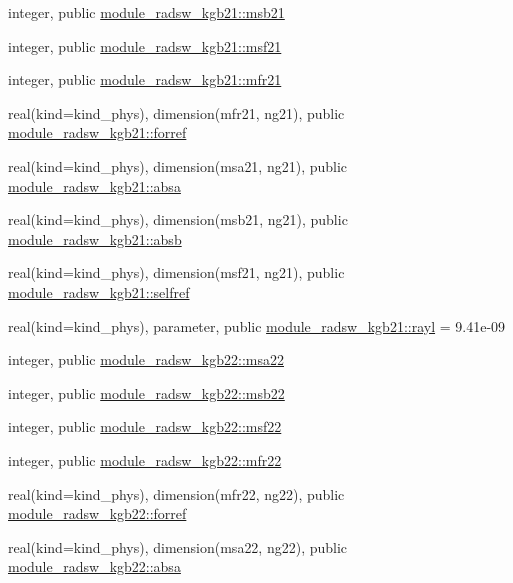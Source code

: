 \begin{DoxyCompactItemize}
\item 
integer, public \hyperlink{group__module__radsw__main_ga59710ca5b31c30385ea968c0f01e2e81}{module\+\_\+radsw\+\_\+kgb21\+::msb21}
\item 
integer, public \hyperlink{group__module__radsw__main_gae70b5abfa847419cbf189d2502c34ddd}{module\+\_\+radsw\+\_\+kgb21\+::msf21}
\item 
integer, public \hyperlink{group__module__radsw__main_ga5575239aa9d55abcca1ac1f82dc4c4ec}{module\+\_\+radsw\+\_\+kgb21\+::mfr21}
\item 
real(kind=kind\+\_\+phys), dimension(mfr21, ng21), public \hyperlink{group__module__radsw__main_gac93d473e0309275f03a89b161377a034}{module\+\_\+radsw\+\_\+kgb21\+::forref}
\item 
real(kind=kind\+\_\+phys), dimension(msa21, ng21), public \hyperlink{group__module__radsw__main_ga7cce83c282d3efec6a3fe319480c270a}{module\+\_\+radsw\+\_\+kgb21\+::absa}
\item 
real(kind=kind\+\_\+phys), dimension(msb21, ng21), public \hyperlink{group__module__radsw__main_ga1d3f12f050c90be49f109205c463b29b}{module\+\_\+radsw\+\_\+kgb21\+::absb}
\item 
real(kind=kind\+\_\+phys), dimension(msf21, ng21), public \hyperlink{group__module__radsw__main_ga76fc3e4566fcee982b99b10ea562ba93}{module\+\_\+radsw\+\_\+kgb21\+::selfref}
\item 
real(kind=kind\+\_\+phys), parameter, public \hyperlink{group__module__radsw__main_ga8df418599fb8aef5fc8f2935a913b361}{module\+\_\+radsw\+\_\+kgb21\+::rayl} = 9.\+41e-\/09
\item 
integer, public \hyperlink{namespacemodule__radsw__kgb22_a4134c2cd3b31db5e0adb5c3c2ad87905}{module\+\_\+radsw\+\_\+kgb22\+::msa22}
\item 
integer, public \hyperlink{group__module__radsw__main_ga3398f8d12ec0349b44197873ac58fd98}{module\+\_\+radsw\+\_\+kgb22\+::msb22}
\item 
integer, public \hyperlink{group__module__radsw__main_ga0903a020c9e4a4f7c21911d2ab98fd46}{module\+\_\+radsw\+\_\+kgb22\+::msf22}
\item 
integer, public \hyperlink{group__module__radsw__main_ga0afe8facbe4837a22c96a0d2000a20ee}{module\+\_\+radsw\+\_\+kgb22\+::mfr22}
\item 
real(kind=kind\+\_\+phys), dimension(mfr22, ng22), public \hyperlink{group__module__radsw__main_ga509916fac772945555a1b3fd0d002c93}{module\+\_\+radsw\+\_\+kgb22\+::forref}
\item 
real(kind=kind\+\_\+phys), dimension(msa22, ng22), public \hyperlink{group__module__radsw__main_ga15ed79e7136ed6d7f11c19a81281af53}{module\+\_\+radsw\+\_\+kgb22\+::absa}

\end{DoxyCompactItemize}
